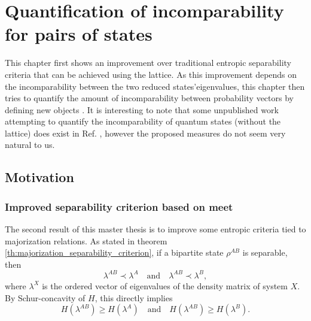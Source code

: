 \chapter{Quantification of incomparability for pairs of states} \label{chap:incomparability} \label{chap:criteria}

This chapter first shows an improvement over traditional entropic separability criteria that can be achieved using the lattice. As this improvement depends on the incomparability between the two reduced states'eigenvalues, this chapter then tries to quantify the amount of incomparability between probability vectors by defining new objects . It is interesting to note that some unpublished work attempting to quantify the incomparability of quantum states (without the lattice) does exist in Ref. \cite{hu_characterizing_2018}, however the proposed measures do not seem very natural to us.



\section{Motivation} \label{sec:incomparability_motivation}

\subsection{Improved separability criterion based on meet}

The second result of this master thesis is to improve some entropic criteria tied to majorization relations. As stated in theorem \ref{th:majorization_separability_criterion}, if a bipartite state $\rho^{AB}$ is separable, then
\begin{equation}
    \lambda^{AB} \prec \lambda^A \quad \text{and} \quad \lambda^{AB} \prec \lambda^{B},
\end{equation}
\noindent where $\lambda^X$ is the ordered vector of eigenvalues of the density matrix of system $X$. By Schur-concavity of $H$, this directly implies
\begin{equation}
    H(\lambda^{AB}) \geq H(\lambda^A) \quad \text{and} \quad H(\lambda^{AB}) \geq H(\lambda^B).
\end{equation}

